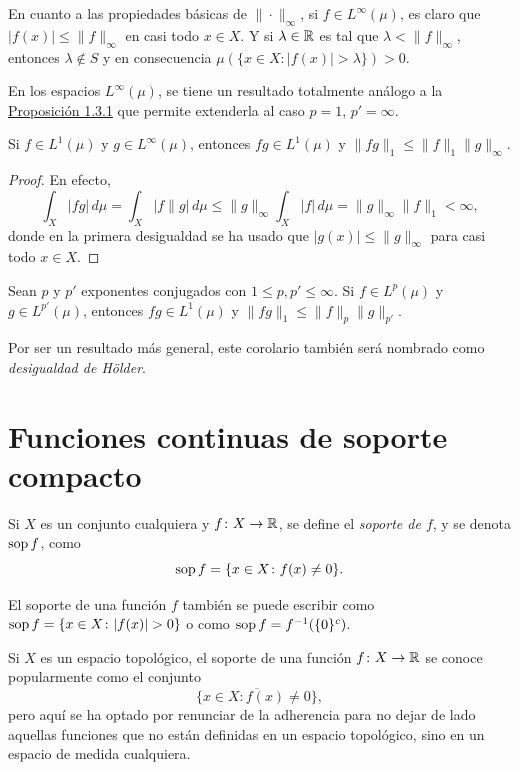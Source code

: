 \documentclass[a4paper, 11pt, oneside]{report}
\begin{document}
En cuanto a las propiedades básicas de $\|\cdot\|_{\infty}$, si $f \in L^\infty(\mu)$, es claro que $|f(x)| \leq \|f\|_\infty$ en casi todo $x \in X$. Y si $\lambda \in \mathbb R$ es tal que $\lambda < \|f\|_\infty$, entonces $\lambda \not\in S$ y en consecuencia $\mu(\{x \in X \colon |f(x)| > \lambda\}) > 0$.

En los espacios $L^\infty(\mu)$, se tiene un resultado totalmente análogo a la \hyperref[pro:1.3.1]{\color{c1}Proposición 1.3.1} que permite extenderla al caso $p = 1$, $p'=\infty$.

\begin{proposition}\label{pro:1.4.3}
  Si $f \in L^1(\mu)$ y $g \in L^{\infty}(\mu)$, entonces $fg \in L^1(\mu)$ y $\|fg\|_1 \leq \|f\|_1\|g\|_{\infty}$.
\end{proposition}

\begin{proof}
  En efecto,
  \[\int_X |fg| \, d\mu = \int_X |f\|g| \, d\mu \leq \|g\|_{\infty} \int_X|f| \, d\mu = \|g\|_{\infty}\|f\|_1 < \infty,\]
  donde en la primera desigualdad se ha usado que $|g(x)| \leq \|g\|_\infty$ para casi todo $x \in X$.
\end{proof}

\begin{corollary}\label{cor:1.4.4}
  Sean $p$ y $p'$ exponentes conjugados con $1 \leq p,p' \leq \infty$. Si $f \in L^p(\mu)$ y $g \in L^{p'}(\mu)$, entonces $fg \in L^1(\mu)$ y $\|fg\|_1 \leq \|f\|_p \|g\|_{p'}$.
\end{corollary}

Por ser un resultado más general, este corolario también será nombrado como \emph{desigualdad de Hölder}.

\section{Funciones continuas de soporte compacto}

\begin{definition}
  Si $X$ es un conjunto cualquiera y $f \colon X \to \mathbb R$, se define el \emph{soporte de $f$}, y se denota $\textup{sop}\, f$, como
  \[\textup{sop}\, f = \{x \in X \colon f(x) \neq 0\}.\]
\end{definition}

El soporte de una función $f$ también se puede escribir como $\textup{sop}\, f = \{x \in X \colon |f(x)| >0\}$ o como $\textup{sop}\, f = f^{-1}(\{0\}^c)$. 

Si $X$ es un espacio topológico, el soporte de una función $f \colon X \to \mathbb R$ se conoce popularmente como el conjunto \[\overline{\{x \in X \colon f(x) \neq 0\}},\] pero aquí se ha optado por renunciar de la adherencia para no dejar de lado aquellas funciones que no están definidas en un espacio topológico, sino en un espacio de medida cualquiera.
\end{document}
